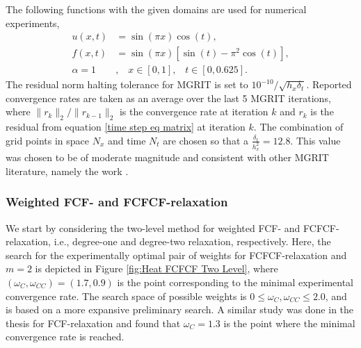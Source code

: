 \documentclass[VANCOUVER,STIX1COL]{WileyNJD-v2}
\begin{document}
The following functions with the given domains are used for numerical experiments,
\begin{subequations}
	\begin{align*}
	u(x, t) &= \sin(\pi x)\cos(t), \\
	f(x,t) &= \sin(\pi x) [\sin(t) - \pi^2 \cos(t)], \\
	\alpha = 1&, \hspace{10pt} x \in [0, 1], \hspace{10pt} t \in [0, 0.625].
	\end{align*}
\end{subequations}
The residual norm halting tolerance for MGRIT is set to $ 10^{-10} / \sqrt{h_x \delta_t}$. 
Reported convergence rates are taken as an average over the last 5 MGRIT
iterations, where $\| r_k\|_2 / \| r_{k-1} \|_2$ is the convergence rate at iteration $k$ and $r_k$ is the residual from equation \eqref{time step eq matrix} at iteration $k$.
The combination of grid points in space $N_x$ and time $N_t$ are chosen so that 
a $\frac{\delta_t}{h_x^2}  = 12.8$.  This value was chosen to be of moderate magnitude and 
consistent with other MGRIT literature, namely the work \cite{Do2016}.

\subsubsection{Weighted FCF- and FCFCF-relaxation}
\label{sec:relax_heat}
We start by considering the two-level method for weighted FCF- and FCFCF-relaxation, i.e., degree-one and 
degree-two relaxation, respectively. Here, the search for the experimentally optimal pair of weights for FCFCF-relaxation and $m=2$ is 
depicted in Figure \ref{fig:Heat FCFCF Two Level}, where $(\omega_{C}, \omega_{CC}) = (1.7, 0.9)$ is the 
point corresponding to the minimal experimental 
convergence rate.  The search space of possible weights is  
$0 \leq \omega_{C}, \omega_{CC} \leq 2.0$, and is based on a more expansive preliminary search.  
A similar study was done in the thesis \cite{Su2019} for 
FCF-relaxation and found that $\omega_{C} = 1.3$ is the point where the minimal 
convergence rate is reached.
\end{document}
